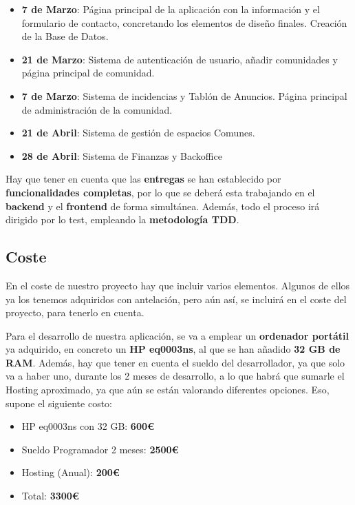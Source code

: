 \begin{itemize}
	\item \textbf{7 de Marzo}: Página principal de la aplicación con la información y el formulario de contacto, concretando los elementos de diseño finales. Creación de la Base de Datos.
	
	\item \textbf{21 de Marzo}: Sistema de autenticación de usuario, añadir comunidades y página principal de comunidad. 
	
	\item \textbf{7 de Marzo}: Sistema de incidencias y Tablón de Anuncios. Página principal de administración de la comunidad.
	
	\item \textbf{21 de Abril}:  Sistema de gestión de espacios Comunes.
	
	\item \textbf{28 de Abril}: Sistema de Finanzas y Backoffice
\end{itemize}

Hay que tener en cuenta que las \textbf{entregas} se han establecido por \textbf{funcionalidades completas}, por lo que se deberá esta trabajando en el \textbf{backend} y el \textbf{frontend} de forma simultánea. Además, todo el proceso irá dirigido por lo test, empleando la \textbf{metodología TDD}.

\subsection{Coste}
En el coste de nuestro proyecto hay que incluir varios elementos. Algunos de ellos ya los tenemos adquiridos con antelación, pero aún así, se incluirá en el coste del proyecto, para tenerlo en cuenta.

Para el desarrollo de nuestra aplicación, se va a emplear un \textbf{ordenador portátil} ya adquirido, en concreto un \textbf{HP eq0003ns}, al que se han añadido \textbf{32 GB de RAM}. Además, hay que tener en cuenta el sueldo del desarrollador, ya que solo va a haber uno, durante los 2 meses de desarrollo, a lo que habrá que sumarle el Hosting aproximado, ya que aún se están valorando diferentes opciones. Eso, supone el siguiente costo:

\begin{itemize}
	\item HP eq0003ns con 32 GB: \textbf{600€}
	\item Sueldo Programador 2 meses: \textbf{2500€}
	\item Hosting (Anual): \textbf{200€}
	\item Total: \textbf{3300€}
\end{itemize}

